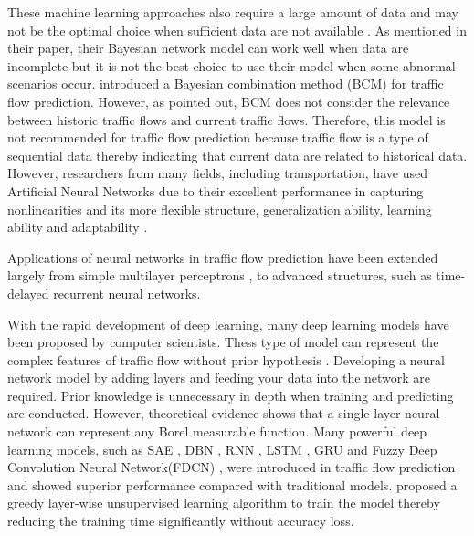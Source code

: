 \documentclass[twocolumn]{article}
\begin{document}
These machine learning approaches also require a large amount of data and may not be the optimal choice when sufficient data are not available \citep{k-NN,sun2006bayesian}. As \citet{sun2006bayesian} mentioned in their paper, their Bayesian network model can work well when data are incomplete but it is not the best choice to use their model when some abnormal scenarios occur. \citet{zheng2006short} introduced a Bayesian combination method (BCM) \citep{petridis2001bayesian} for traffic flow prediction. However, as \citet{wang2014new} pointed out, BCM does not consider the relevance between historic traffic flows and current traffic flows. Therefore, this model is not recommended for traffic flow prediction because traffic flow is a type of sequential data thereby indicating that current data are related to historical data. However, researchers from many fields, including transportation, have used Artificial Neural Networks due to their excellent performance in capturing nonlinearities and its more flexible structure, generalization ability, learning ability and adaptability \citep{DBLP:conf/isnn/LiL09b,li2011incorporating,karlaftis2011statistical,ma2015long}.
\par
Applications of neural networks in traffic flow prediction have been extended largely from simple multilayer perceptrons \citep{clark1993use}, to advanced structures, such as time-delayed recurrent neural networks\citep{abdulhai1999short}.
\par
With the rapid development of deep learning, many deep learning models have been proposed by computer scientists. Thess type of model can represent the complex features of traffic flow without prior hypothesis \citep{lv2015traffic,chen2018novel}. Developing a neural network model by adding layers and feeding your data into the network are required. Prior knowledge is unnecessary in depth when training and predicting are conducted. However, theoretical evidence shows that a single-layer neural network can represent any Borel measurable function\citet{hornik1989multilayer}. Many powerful deep learning models, such as SAE \citep{SAE}, DBN \citep{huang2014deep}, RNN \citep{RNN}, LSTM \citep{LSTMtraffic,ma2015long}, GRU \citep{gruTraffic,zhang2018combining} and Fuzzy Deep Convolution Neural Network(FDCN) \citep{chen2018novel}, were introduced in traffic flow prediction and showed superior performance compared with traditional models. 
\citet{SAE} proposed a greedy layer-wise unsupervised learning algorithm to train the model thereby reducing the training time significantly without accuracy loss.
\end{document}
